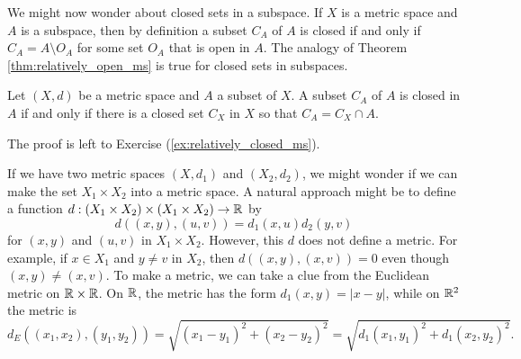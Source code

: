 \begin{comment}

\ActivitySolution

\ba
\item Since $O_A = O_X \cap A$, we also have $a \in O_X$. The fact that $O_X$ is open means that there exists $\delta > 0$ such that $B_X(a, \delta)$ is a subset of $O_X$. 

\item Let $B_A(a, \delta) = B_X(a, \delta) \cap A$. We will show that $B_A(a, \delta)$ is the open ball $B$ in $A$ centered at $a$ of radius $\delta$. If $t \in B_A(a, \delta)$, then $t \in A$ and $t \in B_X(a, \delta)$. So $t \in A$ and $d|_A(t,a) < \delta$. So $t \in B$. Now suppose $t \in B$. Then $t \in A$ and $d|_A(t,a) = d(t,a) < \delta$. Thus, $t \in A$ and $t \in B_X(a, \delta)$. This means that $t \in B_X(a, \delta) \cap A = _A(a, \delta)$. Thus, $B_A(a, \delta) = B$ and $B_A(a, \delta)$ is the open ball in $A$ centered at $a$ of radius $\delta$.

\item Since $B_A(a, \delta)$ is an open set in $A$, we conclude that $O_A$ is a neighborhood of each of its points and $O_A$ is open in $A$. 

\ea

\end{comment}

We might now wonder about closed sets in a subspace. If $X$ is a metric space and $A$ is a subspace, then by definition a subset $C_A$ of $A$ is closed if and only if $C_A = A \setminus O_A$ for some set $O_A$ that is open in $A$. The  analogy of Theorem \ref{thm:relatively_open_ms} is true for closed sets in subspaces.

\begin{theorem} \label{thm:relatively_closed_ms} Let $(X,d)$ be a metric space and $A$ a subset of $X$. A subset $C_A$ of $A$ is closed in $A$ if and only if there is a closed set $C_X$ in $X$ so that $C_A = C_X \cap A$. 
\end{theorem}

The proof is left to Exercise (\ref{ex:relatively_closed_ms}).


If we have two metric spaces $(X, d_1)$ and $(X_2 ,d_2)$, we might wonder if we can make the set $X_1 \times X_2$ into a metric space. A natural approach might be to define a function $d : (X_1 \times X_2) \times (X_1 \times X_2) \to \mathbb{R}$ by 
\[d((x,y),(u,v)) = d_1(x,u)d_2(y,v)\]
for $(x,y)$ and $(u,v)$ in $X_1 \times X_2$. However, this $d$ does not define a metric. For example, if $x \in X_1$ and $y \neq v$ in $X_2$, then $d((x,y),(x,v)) = 0$ even though $(x,y) \neq (x,v)$. To make a metric, we can take a clue from the Euclidean metric on $\mathbb{R} \times \mathbb{R}$. On $\mathbb{R}$, the metric has the form $d_1(x,y) = |x-y|$, while on $\mathbb{R}^2$ the metric  is 
\[d_E((x_1,x_2), (y_1,y_2)) = \sqrt{ (x_1-y_1)^2 + (x_2-y_2)^2} = \sqrt{d_1(x_1,y_1)^2 + d_1(x_2,y_2)^2}.\]

